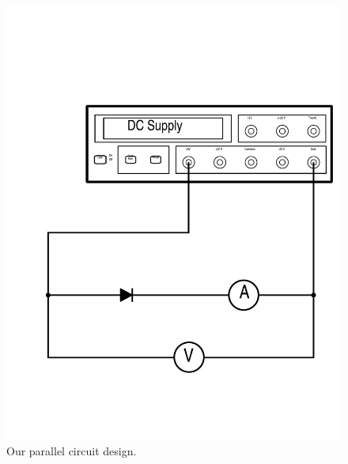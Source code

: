 \documentclass[11pt,letterpaper,onecolumn]{article}
\begin{document}


\begin{figure}[H]
 \begin{center}
 \includegraphics[scale=.25]{Circuit.pdf}
 \caption{ Our parallel circuit design.\label{fig:cir} }
 \end{center}
\end{figure}
\end{document}
